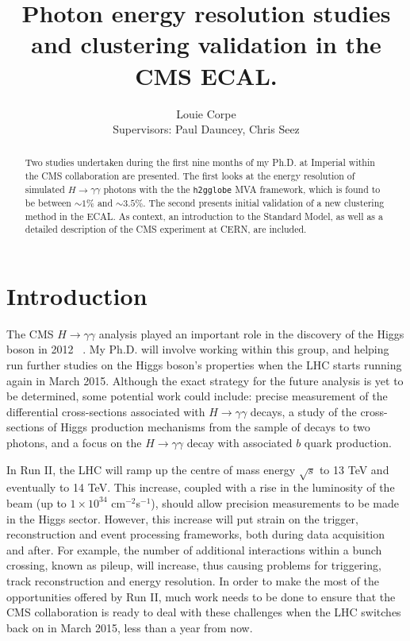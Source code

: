 \documentclass[10pt]{article}
\title{Photon energy resolution studies and clustering validation in the CMS ECAL.}
\author{Louie Corpe \\Supervisors: Paul Dauncey, Chris Seez }
\begin{document}
\maketitle

\renewcommand{\abstractname}{Abstract}
\begin{abstract}
{
Two studies undertaken during the first nine months of my Ph.D. at Imperial within the CMS collaboration are presented. The first looks at the energy resolution of simulated $H\rightarrow \gamma \gamma$ photons with the the \texttt{h2gglobe} MVA framework, which is found to be between $\sim 1\%$ and $\sim 3.5\%$. The second presents initial validation of a new clustering method in the ECAL. As context, an introduction to the Standard Model, as well as a detailed description of the CMS experiment at CERN, are included.}
\end{abstract}



\tableofcontents

\newpage 
\section{Introduction}

The CMS $H \rightarrow \gamma \gamma$ analysis played an important role in the discovery of the Higgs boson in 2012 ~\cite{CMSHDisc}. %
My Ph.D. will involve working within this group, and helping run further studies on the Higgs boson's properties when the LHC starts running again in March 2015. Although the exact strategy for the future analysis is yet to be determined, some potential work could include: precise measurement of the differential cross-sections associated with $H \rightarrow \gamma \gamma$ decays, a study of the cross-sections of Higgs production mechanisms from the sample of decays to two photons, and a focus on the $H \rightarrow \gamma \gamma$ decay with associated $b$ quark production.

In Run II, the LHC will ramp up the centre of mass energy $\sqrt{s}$ to 13 TeV and eventually to 14 TeV. This increase, coupled with a rise in the luminosity of the beam (up to  $1\times10^{34}$ cm$^{-2}$s$^{-1}$), should allow precision measurements to be made in the Higgs sector. However, this increase will put strain on the trigger, reconstruction and event processing frameworks, both during data acquisition and after. For example, the number of additional interactions within a bunch crossing, known as pileup, will increase, thus causing problems for triggering, track reconstruction and energy resolution. In order to make the most of the opportunities offered by Run II, much work needs to be done to ensure that the CMS collaboration is ready to deal with these challenges when the LHC switches back on in March 2015, less than a year from now.
\end{document}
